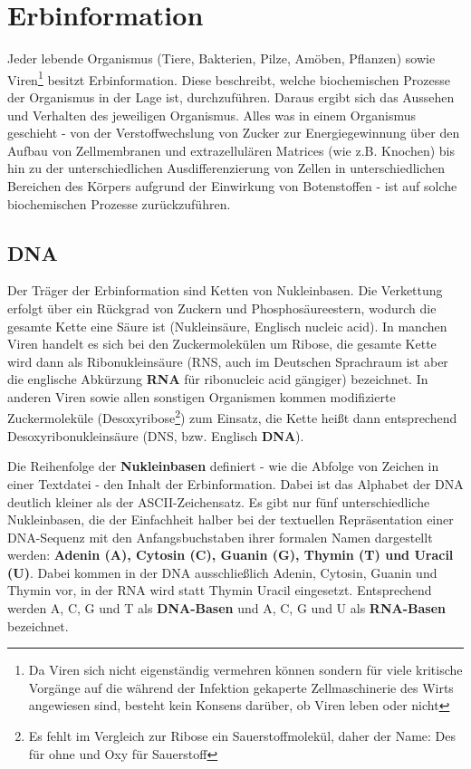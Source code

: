 \section{Erbinformation}
  Jeder lebende Organismus (Tiere, Bakterien, Pilze, Amöben, Pflanzen) sowie Viren\footnote{Da Viren sich nicht eigenständig vermehren können sondern für viele kritische Vorgänge auf die während der Infektion gekaperte Zellmaschinerie des Wirts angewiesen sind, besteht kein Konsens darüber, ob Viren leben oder nicht} besitzt Erbinformation. Diese beschreibt, welche biochemischen Prozesse der Organismus in der Lage ist, durchzuführen. Daraus ergibt sich das Aussehen und Verhalten des jeweiligen Organismus. Alles was in einem Organismus geschieht - von der Verstoffwechslung von Zucker zur Energiegewinnung über den Aufbau von Zellmembranen und extrazellulären Matrices (wie z.B. Knochen) bis hin zu der unterschiedlichen Ausdifferenzierung von Zellen in unterschiedlichen Bereichen des Körpers aufgrund der Einwirkung von Botenstoffen - ist auf solche biochemischen Prozesse zurückzuführen. 

\subsection{DNA}
  Der Träger der Erbinformation sind Ketten von Nukleinbasen. Die Verkettung erfolgt über ein Rückgrad von Zuckern und Phosphosäureestern, wodurch die gesamte Kette eine Säure ist (Nukleinsäure, Englisch nucleic acid). In manchen Viren handelt es sich bei den Zuckermolekülen um Ribose, die gesamte Kette wird dann als Ribonukleinsäure (RNS, auch im Deutschen Sprachraum ist aber die englische Abkürzung \textbf{RNA} für ribonucleic acid gängiger) bezeichnet. In anderen Viren sowie allen sonstigen Organismen kommen modifizierte Zuckermoleküle (Desoxyribose\footnote{Es fehlt im Vergleich zur Ribose ein Sauerstoffmolekül, daher der Name: Des für ohne und Oxy für Sauerstoff}) zum Einsatz, die Kette heißt dann entsprechend Desoxyribonukleinsäure (DNS, bzw. Englisch \textbf{DNA}). 

  Die Reihenfolge der \textbf{Nukleinbasen} definiert - wie die Abfolge von Zeichen in einer Textdatei - den Inhalt der Erbinformation. Dabei ist das Alphabet der DNA deutlich kleiner als der ASCII-Zeichensatz. Es gibt nur fünf unterschiedliche Nukleinbasen, die der Einfachheit halber bei der textuellen Repräsentation einer DNA-Sequenz mit den Anfangsbuchstaben ihrer formalen Namen dargestellt werden: \textbf{Adenin (A), Cytosin (C), Guanin (G), Thymin (T) und Uracil (U)}. Dabei kommen in der DNA ausschließlich Adenin, Cytosin, Guanin und Thymin vor, in der RNA wird statt Thymin Uracil eingesetzt. Entsprechend werden A, C, G und T als \textbf{DNA-Basen} und A, C, G und U als \textbf{RNA-Basen} bezeichnet. 

